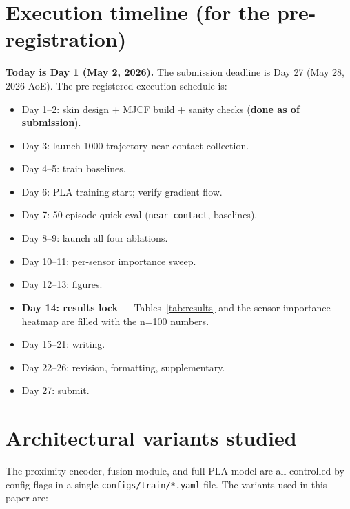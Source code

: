 \documentclass[11pt]{article}
\begin{document}



\appendix
\section{Execution timeline (for the pre-registration)}
\label{app:timeline}

\textbf{Today is Day 1 (May 2, 2026).} The submission deadline is Day 27
(May 28, 2026 AoE). The pre-registered execution schedule is:
\begin{itemize}[leftmargin=1.5em,topsep=0.2em,itemsep=0.2em]
\item Day 1--2: skin design + MJCF build + sanity checks (\textbf{done as of submission}).
\item Day 3: launch 1000-trajectory near-contact collection.
\item Day 4--5: train baselines.
\item Day 6: PLA training start; verify gradient flow.
\item Day 7: 50-episode quick eval (\texttt{near\_contact}, baselines).
\item Day 8--9: launch all four ablations.
\item Day 10--11: per-sensor importance sweep.
\item Day 12--13: figures.
\item \textbf{Day 14: results lock} --- Tables~\ref{tab:results} and the
  sensor-importance heatmap are filled with the n=100 numbers.
\item Day 15--21: writing.
\item Day 22--26: revision, formatting, supplementary.
\item Day 27: submit.
\end{itemize}

\section{Architectural variants studied}
\label{app:variants}

The proximity encoder, fusion module, and full PLA model are all
controlled by config flags in a single \texttt{configs/train/*.yaml}
file. The variants used in this paper are:
\end{document}
